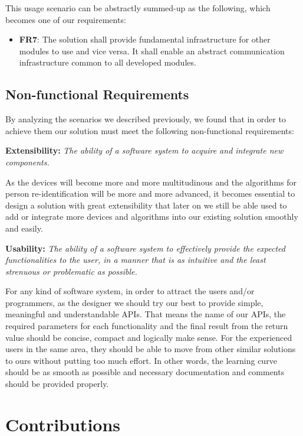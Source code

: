 This usage scenario can be abstractly summed-up as the following, which becomes
one of our requirements:

\begin{itemize}
    \item \textbf{FR7}: The solution shall provide fundamental infrastructure
    for other modules to use and vice versa. It shall enable an abstract 
    communication infrastructure common to all developed modules.
\end{itemize}

\subsection{Non-functional Requirements}
\label{sec:intro-non-func-req}

By analyzing the scenarios we described previously, we found that in order to
achieve them our solution must meet the following non-functional requirements:

\textbf{Extensibility:}
\textit{The ability of a software system to acquire and integrate new
components.}

As the devices will become more and more multitudinous and the algorithms for
person re-identification will be more and more advanced, it becomes essential
to design a solution with great extensibility that later on we still
be able used to add or integrate more devices and algorithms into our existing
solution smoothly and easily.

\textbf{Usability:}
\textit{The ability of a software system to effectively provide the expected
functionalities to the user, in a manner that is as intuitive and the least
strenuous or
problematic as possible.}

For any kind of software system, in order to attract the users and/or programmers, as the designer
we should try our best to provide simple, meaningful and understandable APIs.
That means the name of our APIs, the required parameters for each functionality
and the final result from the return value should be concise, compact and
logically make sense. For the experienced users in the same area, they should
be able to move from other similar solutions to ours without putting too much effort.
In other words, the learning curve should be as smooth as possible
and necessary documentation and comments should be provided properly.

\section{Contributions}
\label{sec:intro-contrib}

